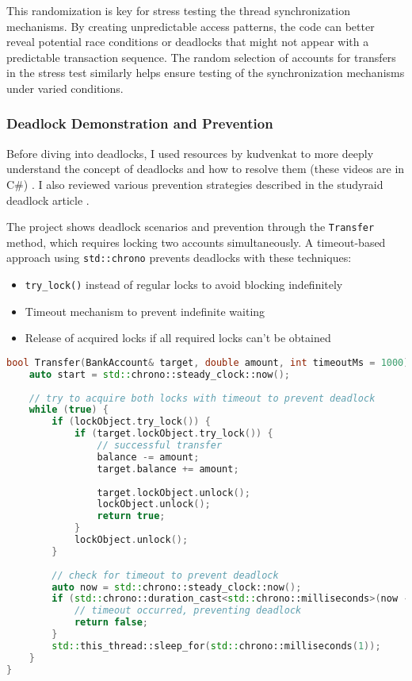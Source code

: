 \documentclass[12pt]{article}
\begin{document}
This randomization is key for stress testing the thread synchronization mechanisms. By creating unpredictable access patterns, the code can better reveal potential race conditions or deadlocks that might not appear with a predictable transaction sequence. The random selection of accounts for transfers in the stress test similarly helps ensure testing of the synchronization mechanisms under varied conditions.

\subsubsection{Deadlock Demonstration and Prevention}
Before diving into deadlocks, I used resources by kudvenkat to more deeply understand the concept of deadlocks and how to resolve them (these videos are in C\#) \cite{deadlock_in_multithreaded} \cite{resolving_deadlock}. I also reviewed various prevention strategies described in the studyraid deadlock article \cite{studyraid_deadlock}.

The project shows deadlock scenarios and prevention through the \texttt{Transfer} method, which requires locking two accounts simultaneously. A timeout-based approach using \texttt{std::chrono} \cite{cpp_chrono} prevents deadlocks with these techniques:

\begin{itemize}
    \item \texttt{try\_lock()} instead of regular locks to avoid blocking indefinitely
    \item Timeout mechanism to prevent indefinite waiting
    \item Release of acquired locks if all required locks can't be obtained
\end{itemize}

\begin{lstlisting}[language=C++, caption=Deadlock Prevention with Timeout]
bool Transfer(BankAccount& target, double amount, int timeoutMs = 1000) {
    auto start = std::chrono::steady_clock::now();
    
    // try to acquire both locks with timeout to prevent deadlock
    while (true) {
        if (lockObject.try_lock()) {
            if (target.lockObject.try_lock()) {
                // successful transfer
                balance -= amount;
                target.balance += amount;
                
                target.lockObject.unlock();
                lockObject.unlock();
                return true;
            }
            lockObject.unlock();
        }
        
        // check for timeout to prevent deadlock
        auto now = std::chrono::steady_clock::now();
        if (std::chrono::duration_cast<std::chrono::milliseconds>(now - start).count() > timeoutMs) {
            // timeout occurred, preventing deadlock
            return false;
        }
        std::this_thread::sleep_for(std::chrono::milliseconds(1));
    }
}
\end{lstlisting}
\end{document}
